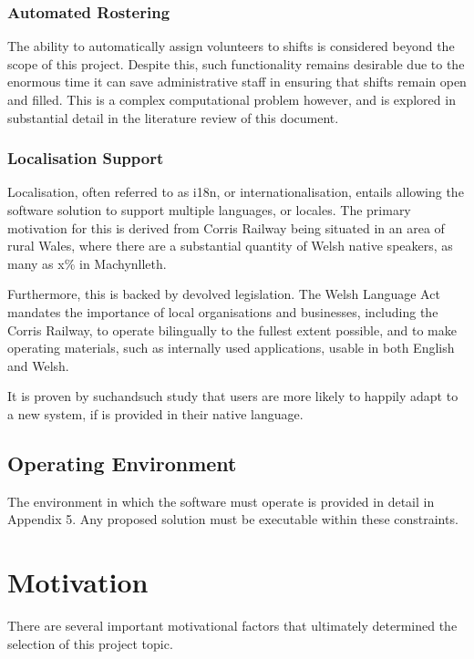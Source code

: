 \subsubsection{Automated Rostering}
The ability to automatically assign volunteers to shifts is considered beyond the scope of this project. Despite this, such functionality remains desirable due to the enormous time it can save administrative staff in ensuring that shifts remain open and filled. This is a complex computational problem however, and is explored in substantial detail in the literature review of this document.

\subsubsection{Localisation Support}
Localisation, often referred to as i18n, or internationalisation, entails allowing the software solution to support multiple languages, or locales. The primary motivation for this is derived from Corris Railway being situated in an area of rural Wales, where there are a substantial quantity of Welsh native speakers, as many as x\% in Machynlleth. %

Furthermore, this is backed by devolved legislation. The Welsh Language Act mandates the importance of local organisations and businesses, including the Corris Railway, to operate bilingually to the fullest extent possible, and to make operating materials, such as internally used applications, usable in both English and Welsh. %

It is proven by suchandsuch study that users are more likely to happily adapt to a new system, if is provided in their native language. %

\subsection{Operating Environment}
The environment in which the software must operate is provided in detail in Appendix 5. Any proposed solution must be executable within these constraints.

\section{Motivation}
There are several important motivational factors that ultimately determined the selection of this project topic.


